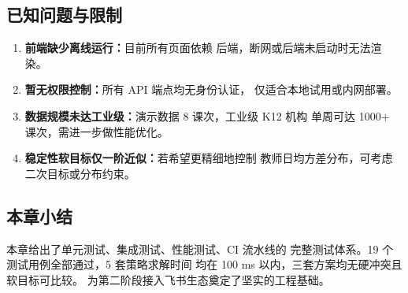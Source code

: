 \subsection{已知问题与限制}

\begin{enumerate}[leftmargin=2em,itemsep=0.2em]
\item \textbf{前端缺少离线运行：}目前所有页面依赖 
   后端，断网或后端未启动时无法渲染。
\item \textbf{暂无权限控制：}所有 API 端点均无身份认证，
   仅适合本地试用或内网部署。
\item \textbf{数据规模未达工业级：}演示数据 8 课次，工业级 K12 机构
   单周可达 1000+ 课次，需进一步做性能优化。
\item \textbf{稳定性软目标仅一阶近似：}若希望更精细地控制
   教师日均方差分布，可考虑二次目标或分布约束。
\end{enumerate}

\subsection{本章小结}

本章给出了单元测试、集成测试、性能测试、CI 流水线的
完整测试体系。19 个测试用例全部通过，5 套策略求解时间
均在 100 ms 以内，三套方案均无硬冲突且软目标可比较。
为第二阶段接入飞书生态奠定了坚实的工程基础。
